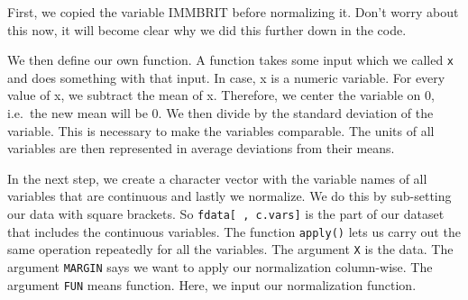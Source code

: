 \documentclass[]{article}
\newenvironment{Shaded}{\begin{snugshade}}{\end{snugshade}}
\newcommand{\CommentTok}[1]{\textcolor[rgb]{0.56,0.35,0.01}{\textit{#1}}}
\newcommand{\ControlFlowTok}[1]{\textcolor[rgb]{0.13,0.29,0.53}{\textbf{#1}}}
\newcommand{\DataTypeTok}[1]{\textcolor[rgb]{0.13,0.29,0.53}{#1}}
\newcommand{\DecValTok}[1]{\textcolor[rgb]{0.00,0.00,0.81}{#1}}
\newcommand{\KeywordTok}[1]{\textcolor[rgb]{0.13,0.29,0.53}{\textbf{#1}}}
\newcommand{\NormalTok}[1]{#1}
\newcommand{\OperatorTok}[1]{\textcolor[rgb]{0.81,0.36,0.00}{\textbf{#1}}}
\newcommand{\StringTok}[1]{\textcolor[rgb]{0.31,0.60,0.02}{#1}}
\begin{document}
\begin{Shaded}
\end{Shaded}

First, we copied the variable IMMBRIT before normalizing it. Don't worry about this now, it will become clear why we did this further down in the code.

We then define our own function. A function takes some input which we called \texttt{x} and does something with that input. In case, x is a numeric variable. For every value of x, we subtract the mean of x. Therefore, we center the variable on 0, i.e.~the new mean will be 0. We then divide by the standard deviation of the variable. This is necessary to make the variables comparable. The units of all variables are then represented in average deviations from their means.

In the next step, we create a character vector with the variable names of all variables that are continuous and lastly we normalize. We do this by sub-setting our data with square brackets. So \texttt{fdata{[}\ ,\ c.vars{]}} is the part of our dataset that includes the continuous variables. The function \texttt{apply()} lets us carry out the same operation repeatedly for all the variables. The argument \texttt{X} is the data. The argument \texttt{MARGIN} says we want to apply our normalization column-wise. The argument \texttt{FUN} means function. Here, we input our normalization function.
\end{document}
